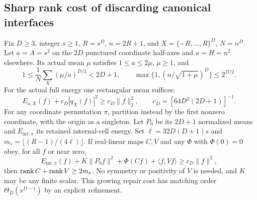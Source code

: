 \subsection{Sharp rank cost of discarding canonical interfaces}
\begin{theorem}\label{thm:filament221}
Fix $D\ge3$, integer $s\ge1$, $R=s^D$, $n=2R+1$, and
$X=\{-R,\ldots,R\}^D$, $N=n^D$. Let $a=A=s^2$ on the $2D$
punctured coordinate half-axes and $a=H=n^2$ elsewhere. Its actual
mean $\mu$ satisfies $1\le a\le2\mu$, $\mu\ge1$, and
\[
 1\le\frac1N\sum_X(\mu/a)^{D/2}<2D+1,\qquad
 \max\{1,(n/\sqrt{1+\mu})^D\}\le2^{D/2}.
\]
For the actual full energy one rectangular mean suffices:
\begin{equation}\label{eq:fullfil221}
 E_{a,X}(f)+c_D|q_X(f)|^2\ge c_D\|f\|_2^2,
 \qquad c_D=[64D^2(2D+1)]^{-1}.
\end{equation}
For any coordinate permutation $\pi$, partition instead by the first
nonzero coordinate, with the origin as a singleton. Let $P_0$ be its
$2D+1$ normalized means and $E_{\mathrm{int},\pi}$ its retained
internal-cell energy. Set $\ell=32D(D+1)s$ and
$m_s=\lfloor(R-1)/(4\ell)\rfloor$. If real-linear maps $C,V$ and
any $\Phi$ with $\Phi(0)=0$ obey, for all $f$ or near zero,
\[
 E_{\mathrm{int},\pi}(f)+K\|P_0f\|^2+\Phi(Cf)+\langle f,Vf\rangle
 \ge c_D\|f\|^2,
\]
then $\operatorname{rank} C+\operatorname{rank} V\ge2m_s$. No symmetry or positivity of $V$
is needed, and $K$ may be any finite scalar. This growing repair cost
has matching order $\Theta_D(s^{D-1})$ by an explicit refinement.
\end{theorem}
